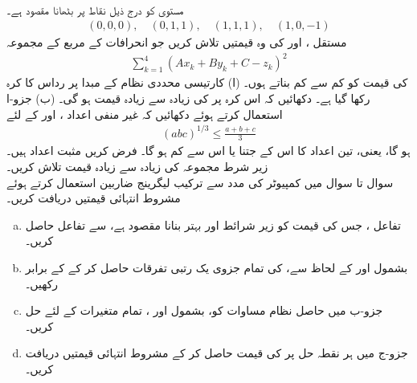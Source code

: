 \\
مستوی  کو درج ذیل نقاط  پر بٹھانا مقصود ہے۔ 
\begin{align*}
(0,0,0),\quad (0,1,1),\quad (1,1,1),\quad (1,0,-1)
\end{align*}
مستقل ،  اور  کی وہ قیمتیں تلاش کریں جو  انحرافات  کے  مربع کے مجموعہ
\begin{align*}
\sum_{k=1}^4 (Ax_k+By_k+C-z_k)^2
\end{align*}
کی قیمت کو کم سے کم بناتے ہوں۔
(ا) کارتیسی محددی  نظام کے مبدا پر  رداس  کا کرہ رکھا گیا ہے۔ دکھائیں کہ اس کرہ پر  کی زیادہ سے زیادہ قیمت  ہو گی۔  (ب) جزو-ا استعمال کرتے ہوئے دکھائیں کہ غیر منفی اعداد ،  اور  کے لئے
\begin{align*}
(abc)^{1/3}\le \frac{a+b+c}{3}
\end{align*}
ہو گا، یعنی،  تین اعداد کا  اس کے    جتنا یا اس سے کم ہو گا۔
فرض کریں  مثبت  اعداد ہیں۔زیر شرط   مجموعہ   کی زیادہ سے زیادہ قیمت تلاش کریں۔
\\
سوال  تا سوال  میں کمپیوٹر کی مدد سے  ترکیب لیگرینج ضاربین استعمال کرتے ہوئے   مشروط انتہائی  قیمتیں دریافت کریں۔
\begin{enumerate}[a.]
\item
تفاعل ،  جس کی قیمت کو زیر شرائط  اور  بہتر بنانا مقصود ہے، سے تفاعل  حاصل کریں۔
\item
 بشمول  اور  کے لحاظ سے،  کی تمام جزوی یک رتبی تفرقات حاصل کر کے  کے برابر رکھیں۔
\item
جزو-ب میں حاصل نظام مساوات کو،  بشمول  اور ،  تمام متغیرات کے لئے حل کریں۔
\item
جزو-ج میں ہر نقطہ حل پر  کی قیمت حاصل کر کے مشروط انتہائی قیمتیں دریافت کریں۔
\end{enumerate}

